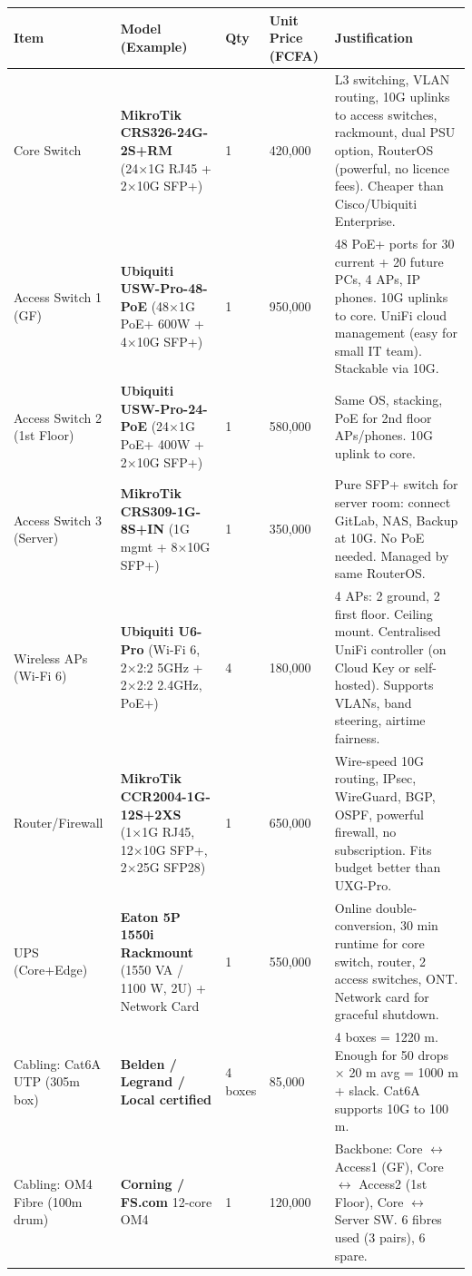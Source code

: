 \documentclass[11pt]{article}
\begin{document}
\begin{exoresolu}
\begin{center}
\begin{tabularx}{\linewidth}{|l|X|l|l|X|}\hline
\rowcolor{popblueL}
\textbf{Item} & \textbf{Model (Example)} & \textbf{Qty} & \textbf{Unit Price (FCFA)} & \textbf{Justification} \\ \hline
Core Switch & \textbf{MikroTik CRS326-24G-2S+RM} (24×1G RJ45 + 2×10G SFP+) & 1 & 420,000 & L3 switching, VLAN routing, 10G uplinks to access switches, rackmount, dual PSU option, RouterOS (powerful, no licence fees). Cheaper than Cisco/Ubiquiti Enterprise. \\ \hline
Access Switch 1 (GF) & \textbf{Ubiquiti USW-Pro-48-PoE} (48×1G PoE+ 600W + 4×10G SFP+) & 1 & 950,000 & 48 PoE+ ports for 30 current + 20 future PCs, 4 APs, IP phones. 10G uplinks to core. UniFi cloud management (easy for small IT team). Stackable via 10G. \\ \hline
Access Switch 2 (1st Floor) & \textbf{Ubiquiti USW-Pro-24-PoE} (24×1G PoE+ 400W + 2×10G SFP+) & 1 & 580,000 & Same OS, stacking, PoE for 2nd floor APs/phones. 10G uplink to core. \\ \hline
Access Switch 3 (Server) & \textbf{MikroTik CRS309-1G-8S+IN} (1G mgmt + 8×10G SFP+) & 1 & 350,000 & Pure SFP+ switch for server room: connect GitLab, NAS, Backup at 10G. No PoE needed. Managed by same RouterOS. \\ \hline
Wireless APs (Wi-Fi 6) & \textbf{Ubiquiti U6-Pro} (Wi-Fi 6, 2×2:2 5GHz + 2×2:2 2.4GHz, PoE+) & 4 & 180,000 & 4 APs: 2 ground, 2 first floor. Ceiling mount. Centralised UniFi controller (on Cloud Key or self-hosted). Supports VLANs, band steering, airtime fairness. \\ \hline
Router/Firewall & \textbf{MikroTik CCR2004-1G-12S+2XS} (1×1G RJ45, 12×10G SFP+, 2×25G SFP28) & 1 & 650,000 & Wire-speed 10G routing, IPsec, WireGuard, BGP, OSPF, powerful firewall, no subscription. Fits budget better than UXG-Pro. \\ \hline
UPS (Core+Edge) & \textbf{Eaton 5P 1550i Rackmount} (1550 VA / 1100 W, 2U) + Network Card & 1 & 550,000 & Online double-conversion, 30 min runtime for core switch, router, 2 access switches, ONT. Network card for graceful shutdown. \\ \hline
Cabling: Cat6A UTP (305m box) & \textbf{Belden / Legrand / Local certified} & 4 boxes & 85,000 & 4 boxes = 1220 m. Enough for 50 drops × 20 m avg = 1000 m + slack. Cat6A supports 10G to 100 m. \\ \hline
Cabling: OM4 Fibre (100m drum) & \textbf{Corning / FS.com} 12-core OM4 & 1 & 120,000 & Backbone: Core $\leftrightarrow$ Access1 (GF), Core $\leftrightarrow$ Access2 (1st Floor), Core $\leftrightarrow$ Server SW. 6 fibres used (3 pairs), 6 spare. \\ \hline

\end{tabularx}
\end{center}
\end{exoresolu}
\end{document}
